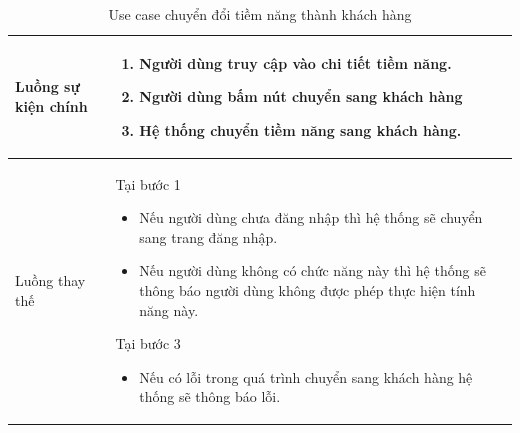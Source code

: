 \documentclass[12pt,a4paper]{article}
\begin{document}
\begin{table}[H]
\begin{tabular}{|p{3.5cm}|p{11.5cm}|c|}
            Luồng sự kiện chính & \vspace{-.8cm}\begin{enumerate}
                                                    \item Người dùng truy cập vào chi tiết tiềm năng.
                                                    \item Người dùng bấm nút chuyển sang khách hàng
                                                    \item Hệ thống chuyển tiềm năng sang khách hàng.
            \end{enumerate}
            \\
            \hline
            Luồng thay thế & Tại bước 1\newline
            \vspace{-.8cm}\begin{itemize}
                              \item Nếu người dùng chưa đăng nhập thì hệ thống sẽ chuyển sang trang đăng nhập.
                              \item Nếu người dùng không có chức năng này thì hệ thống sẽ thông báo người dùng không được phép thực hiện tính năng này.
            \end{itemize}
            Tại bước 3\newline
            \vspace{-.8cm}\begin{itemize}
                              \item Nếu có lỗi trong quá trình chuyển sang khách hàng hệ thống sẽ thông báo lỗi.
            \end{itemize}
            \\ \hline
        \end{tabular}
        \caption{Use case chuyển đổi tiềm năng thành khách hàng}
    \end{table}

\end{document}
